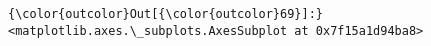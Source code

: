 \documentclass[11pt]{article}
\begin{document}
\begin{Verbatim}[commandchars=\\\{\}]
{\color{outcolor}Out[{\color{outcolor}69}]:} <matplotlib.axes.\_subplots.AxesSubplot at 0x7f15a1d94ba8>
\end{Verbatim}
            
    \begin{center}
    \end{center}
    { \hspace*{\fill} \\}
    
    \begin{center}
    \end{center}
    { \hspace*{\fill} \\}
    
    \begin{center}
    \end{center}
    { \hspace*{\fill} \\}
    
\end{document}
